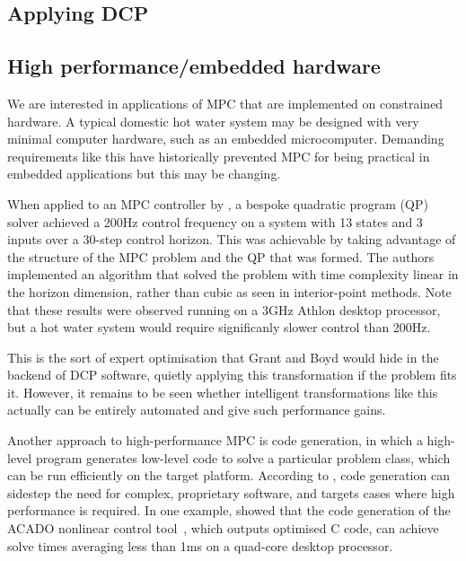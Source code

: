 \subsection{Applying DCP}


\subsection{High performance/embedded hardware}

We are interested in applications of MPC that are implemented on constrained hardware.
A typical domestic hot water system may be designed with very minimal computer hardware, such as an embedded microcomputer.
Demanding requirements like this have historically prevented MPC for being practical in embedded applications but this may be changing.

When applied to an MPC controller by \textcite{Wang10}, a bespoke quadratic program (QP) solver achieved a 200Hz control frequency on a system with 13 states and 3 inputs over a 30-step control horizon.
This was achievable by taking advantage of the structure of the MPC problem and the QP that was formed.
The authors implemented an algorithm that solved the problem with time complexity linear in the horizon dimension, rather than cubic as seen in interior-point methods.
Note that these results were observed running on a 3GHz Athlon desktop processor, but a hot water system would require significanly slower control than 200Hz.

This is the sort of expert optimisation that Grant and Boyd would hide in the backend of DCP software, quietly applying this transformation if the problem fits it.
However, it remains to be seen whether intelligent transformations like this actually can be entirely automated and give such performance gains.

Another approach to high-performance MPC is code generation, in which a high-level program generates low-level code to solve a particular problem class, which can be run efficiently on the target platform.
According to \textcite{Mattingley12}, code generation can sidestep the need for complex, proprietary software, and targets cases where high performance is required.
In one example, \textcite{Vukov12} showed that the code generation of the ACADO nonlinear control tool~\cite{ACADO}, which outputs optimised C code, can achieve solve times averaging less than 1ms on a quad-core desktop processor.

